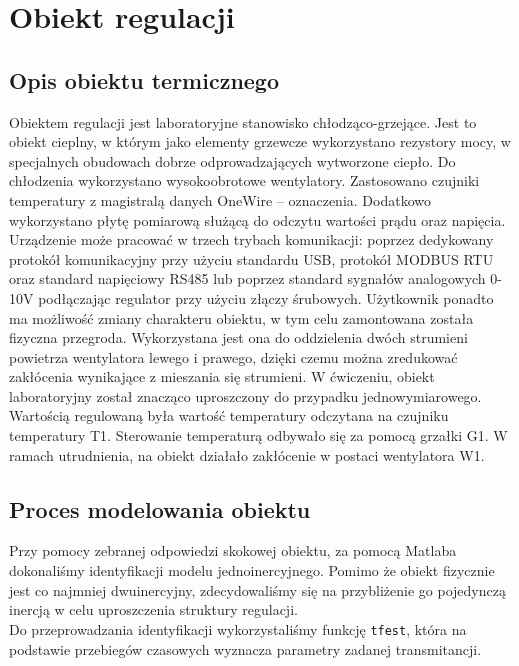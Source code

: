 \documentclass{mwrep}
\begin{document}
\chapter{Obiekt regulacji}
\label{ObiektRegulacji}

\section{Opis obiektu termicznego}
\label{ObiektTermiczny}
Obiektem regulacji jest laboratoryjne stanowisko chłodząco-grzejące. Jest to obiekt cieplny, 
w którym jako elementy grzewcze wykorzystano rezystory mocy, w specjalnych obudowach dobrze odprowadzających
wytworzone ciepło. Do chłodzenia wykorzystano wysokoobrotowe
wentylatory. Zastosowano czujniki temperatury z magistralą danych
OneWire – oznaczenia. Dodatkowo wykorzystano płytę pomiarową
służącą do odczytu wartości prądu oraz napięcia. Urządzenie może pracować w trzech trybach komunikacji: poprzez
dedykowany protokół komunikacyjny przy użyciu standardu USB,
protokół MODBUS RTU oraz standard napięciowy RS485 lub poprzez
standard sygnałów analogowych 0-10V podłączając regulator przy użyciu złączy
śrubowych. Użytkownik ponadto ma możliwość zmiany charakteru obiektu, w tym celu
zamontowana została fizyczna przegroda. Wykorzystana jest ona do oddzielenia dwóch
strumieni powietrza wentylatora lewego i prawego, dzięki czemu można zredukować
zakłócenia wynikające z mieszania się strumieni. W ćwiczeniu, obiekt laboratoryjny
został znacząco uproszczony do przypadku jednowymiarowego. Wartością regulowaną była
wartość temperatury odczytana na czujniku temperatury T1. Sterowanie temperaturą odbywało się 
za pomocą grzałki G1. W ramach utrudnienia, na obiekt działało zakłócenie w postaci wentylatora W1.


\section{Proces modelowania obiektu}
\label{ModelowanieObiektu}
Przy pomocy zebranej odpowiedzi skokowej obiektu, za pomocą Matlaba dokonaliśmy identyfikacji 
modelu jednoinercyjnego. Pomimo że obiekt fizycznie jest co najmniej dwuinercyjny, zdecydowaliśmy się na 
przybliżenie go pojedynczą inercją w celu uproszczenia struktury regulacji. \\
\indent Do przeprowadzania identyfikacji wykorzystaliśmy funkcję \texttt{tfest}, która na podstawie 
przebiegów czasowych wyznacza parametry zadanej transmitancji. 
\end{document}
